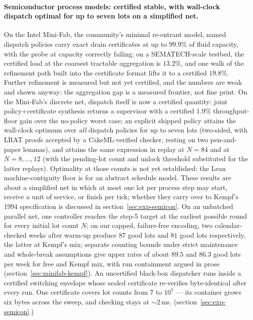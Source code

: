 \paragraph{Semiconductor process models: certified stable, with
wall-clock dispatch optimal for up to seven lots on a simplified net.} On the
Intel Mini-Fab, the community's minimal re-entrant model, named
dispatch policies
carry exact drain certificates at up to $99.9\%$ of fluid capacity,
with the probe at capacity correctly failing; on a SEMATECH-scale
testbed, the certified load at the coarsest tractable aggregation is
$13.2\%$, and one walk of the refinement path built into the
certificate format lifts it to a certified $19.8\%$. Further
refinement is measured but not yet certified, and the numbers are
weak and shown anyway: the aggregation gap is a measured frontier,
not fine print. On the Mini-Fab's discrete net, dispatch itself is
now a certified quantity: joint policy+certificate synthesis returns
a supervisor with a certified $1.9\%$ throughput-floor gain over the
no-policy worst case; an explicit shipped policy attains the
wall-clock optimum over \emph{all} dispatch policies for up to seven
lots (two-sided, with LRAT proofs accepted by a CakeML-verified
checker, resting on two pen-and-paper lemmas), and attains the same
expression in replay at $N=84$ and at $N=8,\dots,12$ (with the
pending-lot count and unlock threshold substituted for the latter
replays). Optimality at those counts is not yet established: the
Lean machine-contiguity floor is for an abstract schedule model. These
results are about a simplified net in which at most one lot per
process step may start, receive a unit of service, or finish per
tick; whether they carry over to Kempf's 1994 specification is
discussed in section~\ref{sec:exp-semicon}. On an unbatched parallel net, one controller reaches the step-5 target
at the earliest possible round for every initial lot count $N$; on our
capped, failure-free encoding, two calendar-checked weeks after warm-up
produce $87$ good lots and $81$ good lots respectively, the latter at
Kempf's mix; separate counting bounds under strict maintenance and
whole-break assumptions give upper rates of about $89.5$ and $86.3$ good
lots per week for free and Kempf mix, with run containment argued in
prose (section~\ref{sec:minifab-kempf}). An uncertified black-box dispatcher runs inside a
certified switching envelope whose sealed certificate re-verifies
byte-identical after every run. One certificate covers lot counts
from $7$ to $10^{7}$ --- its container grows six bytes across the
sweep, and checking stays at ${\sim}2$\,ms.
(section~\ref{sec:exp-semicon}.)

